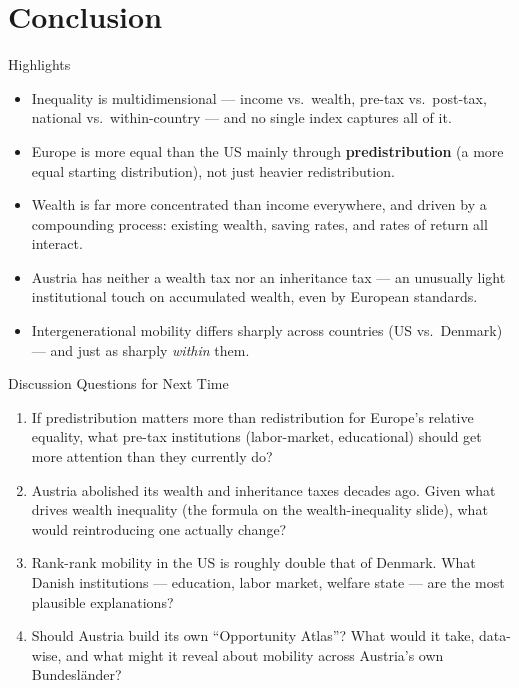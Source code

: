 \documentclass[11pt,aspectratio=169]{beamer}
\begin{document}
\section{Conclusion}

\begin{frame}{Highlights}
  \small
  \begin{itemize}
    \item Inequality is multidimensional --- income vs.\ wealth, pre-tax vs.\ post-tax, national vs.\ within-country --- and no single index captures all of it.
    \item Europe is more equal than the US mainly through \textbf{predistribution} (a more equal starting distribution), not just heavier redistribution.
    \item Wealth is far more concentrated than income everywhere, and driven by a compounding process: existing wealth, saving rates, and rates of return all interact.
    \item Austria has neither a wealth tax nor an inheritance tax --- an unusually light institutional touch on accumulated wealth, even by European standards.
    \item Intergenerational mobility differs sharply across countries (US vs.\ Denmark) --- and just as sharply \emph{within} them.
  \end{itemize}
\end{frame}

\begin{frame}{Discussion Questions for Next Time}
  \small
  \begin{enumerate}
    \item If predistribution matters more than redistribution for Europe's relative equality, what pre-tax institutions (labor-market, educational) should get more attention than they currently do?
    \item Austria abolished its wealth and inheritance taxes decades ago. Given what drives wealth inequality (the formula on the wealth-inequality slide), what would reintroducing one actually change?
    \item Rank-rank mobility in the US is roughly double that of Denmark. What Danish institutions --- education, labor market, welfare state --- are the most plausible explanations?
    \item Should Austria build its own ``Opportunity Atlas''? What would it take, data-wise, and what might it reveal about mobility across Austria's own Bundesländer?
  \end{enumerate}
\end{frame}
\end{document}
